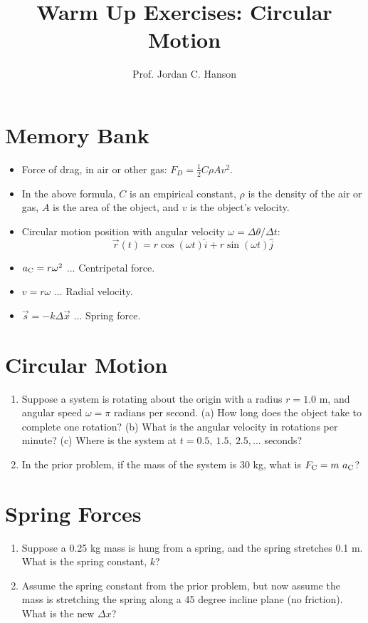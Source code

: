 \documentclass{article}
\begin{document}
\title{Warm Up Exercises: Circular Motion}
\author{Prof. Jordan C. Hanson}

\maketitle

\section{Memory Bank}

\begin{itemize}
\item Force of drag, in air or other gas: $F_D = \frac{1}{2}C \rho A v^2$.
\item In the above formula, $C$ is an empirical constant, $\rho$ is the density of the air or gas, $A$ is the area of the object, and $v$ is the object's velocity.
\item Circular motion position with angular velocity $\omega = \Delta \theta / \Delta t$:
\begin{equation}
\vec{r}(t) = r\cos(\omega t)\hat{i} + r\sin(\omega t)\hat{j}
\end{equation}
\item $a_{\rm C} = r \omega^2$ ... Centripetal force.
\item $v = r\omega$ ... Radial velocity.
\item $\vec{s} = - k \Delta \vec{x}$ ... Spring force.
\end{itemize}

\section{Circular Motion}
\begin{enumerate}
\item Suppose a system is rotating about the origin with a radius $r = 1.0$ m, and angular speed $\omega = \pi$ radians per second. (a) How long does the object take to complete one rotation?  (b) What is the angular velocity in rotations per minute? (c) Where is the system at $t = 0.5,~1.5,~2.5, ...$ seconds? \\ \vspace{2cm}
\item In the prior problem, if the mass of the system is 30 kg, what is $F_{\rm C} = m ~ a_{\rm C}$? \\ \vspace{1cm}
\end{enumerate}

\section{Spring Forces}
\begin{enumerate}
\item Suppose a 0.25 kg mass is hung from a spring, and the spring stretches 0.1 m.  What is the spring constant, $k$? \\ \vspace{1cm}
\item Assume the spring constant from the prior problem, but now assume the mass is stretching the spring along a 45 degree incline plane (no friction).  What is the new $\Delta x$?
\end{enumerate}
\end{document}
